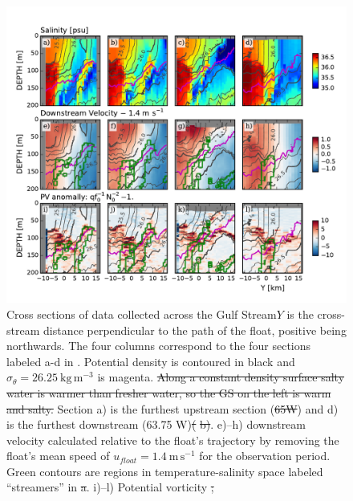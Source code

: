\documentclass[draft,grl]{agutex2015}
\providecommand{\DIFadd}[1]{{\protect\color{blue}\uwave{#1}}} %
\providecommand{\DIFdel}[1]{{\protect\color{red}\sout{#1}}}                      %
\providecommand{\DIFaddFL}[1]{\DIFadd{#1}} %
\providecommand{\DIFdelFL}[1]{\DIFdel{#1}} %
\providecommand{\DIFaddbeginFL}{} %
\providecommand{\DIFaddendFL}{} %
\providecommand{\DIFdelbeginFL}{} %
\providecommand{\DIFdelendFL}{} %
\begin{document}
\begin{article}
\begin{figure}[htbp]
  \centering
    \includegraphics[width=\textwidth]{./SalDFirstStreamer.pdf}
    \caption{Cross sections of data collected across the Gulf Stream\DIFaddbeginFL \DIFaddFL{.   }\DIFaddendFL $Y$ is the cross-stream distance perpendicular to the path of the float, positive being northwards.  The four columns correspond to the  four sections labeled a-d in . Potential density is contoured in black and $\sigma_{\theta}=26.25\ \mathrm{kg\,m^{-3}}$ is magenta.  \DIFdelbeginFL \DIFdelFL{Along a constant density surface salty water is warmer than fresher water, so the GS on the left is warm and salty.  }\DIFdelendFL Section a) is the furthest upstream section (\DIFdelbeginFL \DIFdelFL{65W}\DIFdelendFL \DIFaddbeginFL \DIFaddFL{65 W}\DIFaddendFL ) and d) is the furthest downstream (63.75 W\DIFaddbeginFL \DIFaddFL{, }\DIFaddendFL )\DIFdelbeginFL \DIFdelFL{(}%
\DIFdelFL{b)}\DIFdelendFL .  e)--h) downstream velocity calculated relative to the float's trajectory by removing the float's mean speed of $u_{float}=1.4\ \mathrm{m\,s^{-1}}$ for the observation period.   Green contours are regions in temperature-salinity space labeled ``streamers'' in \DIFdelbeginFL %
\DIFdelFL{a}\DIFdelendFL \DIFaddbeginFL {}\DIFaddendFL .  i)--l) Potential vorticity \DIFdelbeginFL \DIFdelFL{;
 }\DIFdelendFL \DIFaddbeginFL \DIFaddFL{anomaly.  
 }\DIFaddendFL } \label{fig:SalDFirstStreamer}
\end{figure}


\end{article}
\end{document}
